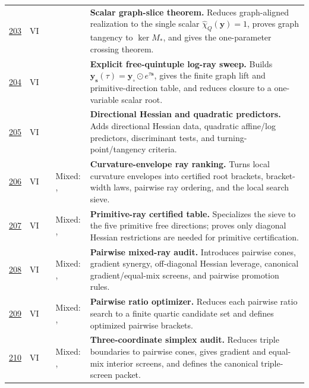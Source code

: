 {\begin{longtable}{@{}L{0.055\textwidth}L{0.075\textwidth}L{0.145\textwidth}L{0.235\textwidth}L{0.43\textwidth}@{}}
\addlinespace
\hyperref[stage:203]{203} & VI &  & \StatusExactClosure{} & \textbf{Scalar graph-slice theorem.} Reduces graph-aligned realization to the single scalar \(\widehat\chi_Q(\mathbf y)=1\), proves graph tangency to \(\ker M_*\), and gives the one-parameter crossing theorem. \\
\addlinespace
\hyperref[stage:204]{204} & VI &  & \StatusExactClosure{} & \textbf{Explicit free-quintuple log-ray sweep.} Builds \(\mathbf y_{\mathbf s}(\tau)=\mathbf y_\circ\odot e^{\tau\mathbf s}\), gives the finite graph lift and primitive-direction table, and reduces closure to a one-variable scalar root. \\
\addlinespace
\hyperref[stage:205]{205} & VI &  & \StatusExactClosure{} & \textbf{Directional Hessian and quadratic predictors.} Adds directional Hessian data, quadratic affine/log predictors, discriminant tests, and turning-point/tangency criteria. \\
\addlinespace
\hyperref[stage:206]{206} & VI &  & Mixed: \StatusExactClosure{}, \StatusNumerical{} & \textbf{Curvature-envelope ray ranking.} Turns local curvature envelopes into certified root brackets, bracket-width laws, pairwise ray ordering, and the local search sieve. \\
\addlinespace
\hyperref[stage:207]{207} & VI &  & Mixed: \StatusExactClosure{}, \StatusNumerical{} & \textbf{Primitive-ray certified table.} Specializes the sieve to the five primitive free directions; proves only diagonal Hessian restrictions are needed for primitive certification. \\
\addlinespace
\hyperref[stage:208]{208} & VI &  & Mixed: \StatusExactClosure{}, \StatusNumerical{} & \textbf{Pairwise mixed-ray audit.} Introduces pairwise cones, gradient synergy, off-diagonal Hessian leverage, canonical gradient/equal-mix screens, and pairwise promotion rules. \\
\addlinespace
\hyperref[stage:209]{209} & VI &  & Mixed: \StatusExactClosure{}, \StatusNumerical{} & \textbf{Pairwise ratio optimizer.} Reduces each pairwise ratio search to a finite quartic candidate set and defines optimized pairwise brackets. \\
\addlinespace
\hyperref[stage:210]{210} & VI &  & Mixed: \StatusExactClosure{}, \StatusNumerical{} & \textbf{Three-coordinate simplex audit.} Reduces triple boundaries to pairwise cones, gives gradient and equal-mix interior screens, and defines the canonical triple-screen packet. \\

\end{longtable}}
